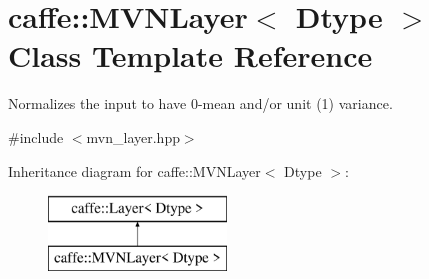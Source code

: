 \hypertarget{classcaffe_1_1MVNLayer}{}\section{caffe\+:\+:M\+V\+N\+Layer$<$ Dtype $>$ Class Template Reference}
\label{classcaffe_1_1MVNLayer}


Normalizes the input to have 0-\/mean and/or unit (1) variance.  




{\ttfamily \#include $<$mvn\+\_\+layer.\+hpp$>$}

Inheritance diagram for caffe\+:\+:M\+V\+N\+Layer$<$ Dtype $>$\+:\begin{figure}[H]
\begin{center}
\leavevmode
\includegraphics[height=2.000000cm]{classcaffe_1_1MVNLayer}
\end{center}
\end{figure}

